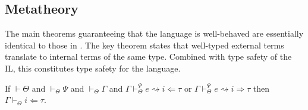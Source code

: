\documentclass{sig-alternate}
\newcommand{\myvdash}{\vdash_{\Theta}^{\Psi}}
\begin{document}



\subsection{Metatheory}
The main theorems guaranteeing that the language is well-behaved are essentially identical to those in \cite{TSLs}. The key theorem states that well-typed external terms translate to internal terms of the same type. Combined with type safety of the IL, this constitutes type safety for the language.

\begin{theorem}
If $\vdash\Theta$ and $\vdash_{\Theta}\Psi$ and $\vdash_{\Theta}\Gamma$ and $\Gamma\vdash_{\Theta}^{\Psi} e\rightsquigarrow i\Leftarrow\tau$ or $\Gamma\vdash_{\Theta}^{\Psi} e\rightsquigarrow i\Rightarrow\tau$ then $\Gamma\vdash_{\Theta} i\Leftarrow\tau$.
\end{theorem}
\end{document}
